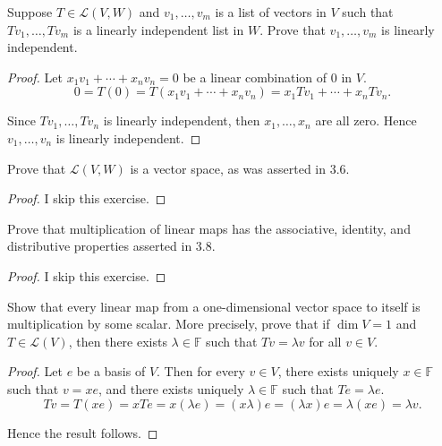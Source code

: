 \begin{exercise}
    Suppose $T\in \mathcal{L}(V, W)$ and $v_{1}, \ldots, v_{m}$ is a list of vectors in $V$ such that $Tv_{1}, \ldots, Tv_{m}$ is a linearly independent list in $W$. Prove that $v_{1}, \ldots, v_{m}$ is linearly independent.
\end{exercise}

\begin{proof}
    Let $x_{1}v_{1} + \cdots + x_{n}v_{n} = 0$ be a linear combination of $0$ in $V$.
    \[
        0 = T(0) = T(x_{1}v_{1} + \cdots + x_{n}v_{n}) = x_{1}Tv_{1} + \cdots + x_{n}Tv_{n}.
    \]

    Since $Tv_{1}, \ldots, Tv_{n}$ is linearly independent, then $x_{1}, \ldots, x_{n}$ are all zero. Hence $v_{1}, \ldots, v_{n}$ is linearly independent.
\end{proof}
\newpage

\begin{exercise}
    Prove that $\mathcal{L}(V, W)$ is a vector space, as was asserted in 3.6.
\end{exercise}

\begin{proof}
    I skip this exercise.
\end{proof}
\newpage

\begin{exercise}
    Prove that multiplication of linear maps has the associative, identity, and distributive properties asserted in 3.8.
\end{exercise}

\begin{proof}
    I skip this exercise.
\end{proof}
\newpage

\begin{exercise}
    Show that every linear map from a one-dimensional vector space to itself is
    multiplication by some scalar. More precisely, prove that if $\dim V = 1$ and $T\in \mathcal{L}(V)$, then there exists $\lambda\in\mathbb{F}$ such that $Tv = \lambda v$ for all $v\in V$.
\end{exercise}

\begin{proof}
    Let $e$ be a basis of $V$. Then for every $v\in V$, there exists uniquely $x\in\mathbb{F}$ such that $v = xe$, and there exists uniquely $\lambda\in\mathbb{F}$ such that $Te = \lambda e$.
    \[
        Tv = T(xe) = xTe = x(\lambda e) = (x\lambda)e = (\lambda x)e = \lambda(xe) = \lambda v.
    \]

    Hence the result follows.
\end{proof}
\newpage

